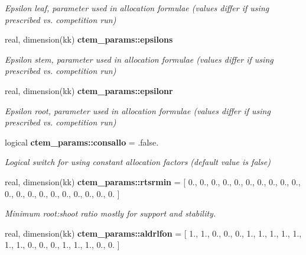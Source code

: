 \begin{DoxyCompactItemize}
\begin{DoxyCompactList}\small\item\em Epsilon leaf, parameter used in allocation formulae (values differ if using prescribed vs. competition run) \end{DoxyCompactList}\item 
\hypertarget{namespacectem__params_ae5c289e0db08b110ab093ab912b1955b}{}real, dimension(kk) {\bfseries ctem\+\_\+params\+::epsilons}\label{namespacectem__params_ae5c289e0db08b110ab093ab912b1955b}

\begin{DoxyCompactList}\small\item\em Epsilon stem, parameter used in allocation formulae (values differ if using prescribed vs. competition run) \end{DoxyCompactList}\item 
\hypertarget{namespacectem__params_aa0fc6a57a8dd09d0a6d57ccf9c2fdf5b}{}real, dimension(kk) {\bfseries ctem\+\_\+params\+::epsilonr}\label{namespacectem__params_aa0fc6a57a8dd09d0a6d57ccf9c2fdf5b}

\begin{DoxyCompactList}\small\item\em Epsilon root, parameter used in allocation formulae (values differ if using prescribed vs. competition run) \end{DoxyCompactList}\item 
\hypertarget{namespacectem__params_a7fc44574a63fd52e0b2556ba693de814}{}logical {\bfseries ctem\+\_\+params\+::consallo} = .false.\label{namespacectem__params_a7fc44574a63fd52e0b2556ba693de814}

\begin{DoxyCompactList}\small\item\em Logical switch for using constant allocation factors (default value is false) \end{DoxyCompactList}\item 
\hypertarget{namespacectem__params_ac542a7713cfae8ce6e7197c8d60c2081}{}real, dimension(kk) {\bfseries ctem\+\_\+params\+::rtsrmin} = \mbox{[} 0., 0., 0., 0., 0., 0., 0., 0., 0., 0., 0., 0., 0., 0., 0., 0., 0., 0., 0., 0. \mbox{]}\label{namespacectem__params_ac542a7713cfae8ce6e7197c8d60c2081}

\begin{DoxyCompactList}\small\item\em Minimum root\+:shoot ratio mostly for support and stability. \end{DoxyCompactList}\item 
\hypertarget{namespacectem__params_ab8a436206695f5f6c93d0579187ba037}{}real, dimension(kk) {\bfseries ctem\+\_\+params\+::aldrlfon} = \mbox{[} 1., 1., 0., 0., 0., 1., 1., 1., 1., 1., 1., 1., 0., 0., 0., 1., 1., 1., 0., 0. \mbox{]}\label{namespacectem__params_ab8a436206695f5f6c93d0579187ba037}


\end{DoxyCompactItemize}
